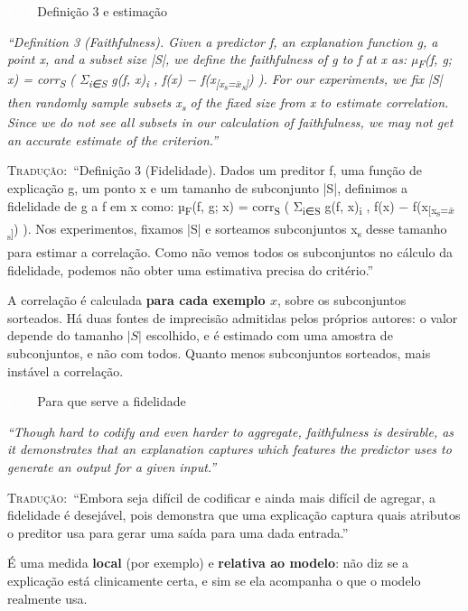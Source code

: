 \documentclass[11pt,a4paper]{article}
\newcommand{\pagechip}[1]{{\setlength{\fboxsep}{1.5pt}\colorbox{cAcc}{\textcolor{white}{\scriptsize\texttt{#1}}}}}
\newenvironment{origquote}{\par\itshape\small}{\par}
\newenvironment{tradquote}{\par\small\textsc{Tradução:}\ }{\par}
\newcommand{\explab}[1]{\par\smallskip{\small\color{cAcc}\textbf{\MakeUppercase{#1}}}\par}
\begin{document}
\begin{citacard}{\pagechip{p. 2} Definição 3 e estimação}
\begin{origquote}“Definition 3 (Faithfulness). Given a predictor f, an explanation function g, a point x, and a subset size |S|, we define the faithfulness of g to f at x as: µ\textsubscript{F}(f, g; x) = corr\textsubscript{S} ( Σ\textsubscript{i∈S} g(f, x)\textsubscript{i} , f(x) − f(x\textsubscript{[x\textsubscript{s}=\ensuremath{\bar{x}}\textsubscript{s}]}) ). For our experiments, we fix |S| then randomly sample subsets x\textsubscript{s} of the fixed size from x to estimate correlation. Since we do not see all subsets in our calculation of faithfulness, we may not get an accurate estimate of the criterion.”\end{origquote}
\begin{tradquote}“Definição 3 (Fidelidade). Dados um preditor f, uma função de explicação g, um ponto x e um tamanho de subconjunto |S|, definimos a fidelidade de g a f em x como: µ\textsubscript{F}(f, g; x) = corr\textsubscript{S} ( Σ\textsubscript{i∈S} g(f, x)\textsubscript{i} , f(x) − f(x\textsubscript{[x\textsubscript{s}=\ensuremath{\bar{x}}\textsubscript{s}]}) ). Nos experimentos, fixamos |S| e sorteamos subconjuntos x\textsubscript{s} desse tamanho para estimar a correlação. Como não vemos todos os subconjuntos no cálculo da fidelidade, podemos não obter uma estimativa precisa do critério.”\end{tradquote}
\explab{Explicação}
A correlação é calculada \textbf{para cada exemplo $x$}, sobre os subconjuntos sorteados. Há duas fontes de imprecisão admitidas pelos próprios autores: o valor depende do tamanho $|S|$ escolhido, e é estimado com uma amostra de subconjuntos, e não com todos. Quanto menos subconjuntos sorteados, mais instável a correlação.
\end{citacard}

\begin{citacard}{\pagechip{p. 2} Para que serve a fidelidade}
\begin{origquote}“Though hard to codify and even harder to aggregate, faithfulness is desirable, as it demonstrates that an explanation captures which features the predictor uses to generate an output for a given input.”\end{origquote}
\begin{tradquote}“Embora seja difícil de codificar e ainda mais difícil de agregar, a fidelidade é desejável, pois demonstra que uma explicação captura quais atributos o preditor usa para gerar uma saída para uma dada entrada.”\end{tradquote}
\explab{Explicação}
É uma medida \textbf{local} (por exemplo) e \textbf{relativa ao modelo}: não diz se a explicação está clinicamente certa, e sim se ela acompanha o que o modelo realmente usa.
\end{citacard}
\end{document}
